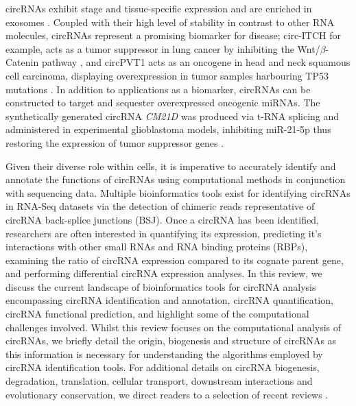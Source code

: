 \documentclass[pdflatex,sn-mathphys-num]{sn-jnl}
\begin{document}
circRNAs exhibit stage and tissue-specific expression \cite{circRNA_finder, Gruner2016, Rybak-Wolf2015Jun} and are enriched in exosomes \cite{Li2015Aug}. Coupled with their high level of stability in contrast to other RNA molecules, circRNAs represent a promising biomarker for disease; circ-ITCH for example, acts as a tumor suppressor in lung cancer by inhibiting the Wnt/$\beta$-Catenin pathway \cite{Wan2016}, and circPVT1 acts as an oncogene in head and neck squamous cell carcinoma, displaying overexpression in tumor samples harbouring TP53 mutations \cite{Verduci2017Dec}. In addition to applications as a biomarker, circRNAs can be constructed to target and sequester overexpressed oncogenic miRNAs. The synthetically generated circRNA \textit{CM21D} was produced via t-RNA splicing and administered in experimental glioblastoma models, inhibiting miR-21-5p thus restoring the expression of tumor suppressor genes \cite{Bayat2023Jun}. \par

Given their diverse role within cells, it is imperative to accurately identify and annotate the functions of circRNAs using computational methods in conjunction with sequencing data. Multiple bioinformatics tools exist for identifying circRNAs in RNA-Seq datasets via the detection of chimeric reads representative of circRNA back-splice junctions (BSJ). Once a circRNA has been identified, researchers are often interested in quantifying its expression, predicting it's interactions with other small RNAs and RNA binding proteins (RBPs), examining the ratio of circRNA expression compared to its cognate parent gene, and performing differential circRNA expression analyses. In this review, we discuss the current landscape of bioinformatics tools for circRNA analysis encompassing circRNA identification and annotation, circRNA quantification, circRNA functional prediction, and highlight some of the computational challenges involved. Whilst this review focuses on the computational analysis of circRNAs, we briefly detail the origin, biogenesis and structure of circRNAs as this information is necessary for understanding the algorithms employed by circRNA identification tools. For additional details on circRNA biogenesis, degradation, translation, cellular transport, downstream interactions and evolutionary conservation, we direct readers to a selection of recent reviews \cite{Greene2017Jun, Kristensen2019Nov, Li2018Aug, Ren2022Dec, Yang2021May, Huang2020, Panda2018, Santos-Rodriguez2021Sep}. \par
\end{document}
